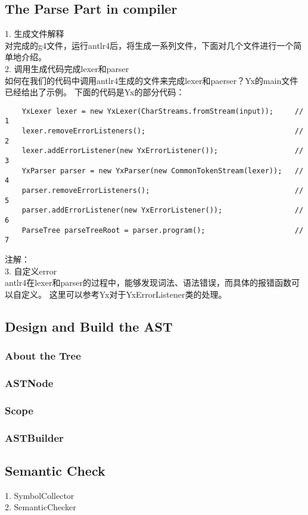 \subsection{The Parse Part in compiler}
1. 生成文件解释 \\
对完成的g4文件，运行antlr4后，将生成一系列文件，下面对几个文件进行一个简单地介绍。 \\


2. 调用生成代码完成lexer和parser \\
如何在我们的代码中调用antlr4生成的文件来完成lexer和paerser？Yx的main文件已经给出了示例。
下面的代码是Yx的部分代码：\\
\begin{verbatim}
    YxLexer lexer = new YxLexer(CharStreams.fromStream(input));     // 1
    lexer.removeErrorListeners();                                   // 2
    lexer.addErrorListener(new YxErrorListener());                  // 3    
    YxParser parser = new YxParser(new CommonTokenStream(lexer));   // 4
    parser.removeErrorListeners();                                  // 5
    parser.addErrorListener(new YxErrorListener());                 // 6
    ParseTree parseTreeRoot = parser.program();                     // 7
\end{verbatim}
注解： \\


3. 自定义error \\
antlr4在lexer和parser的过程中，能够发现词法、语法错误，而具体的报错函数可以自定义。
这里可以参考Yx对于YxErrorListener类的处理。

\subsection{Design and Build the AST}
\subsubsection{About the Tree}

\subsubsection{ASTNode}

\subsubsection{Scope}

\subsubsection{ASTBuilder}


\subsection{Semantic Check}
1. SymbolCollector \\

2. SemanticChecker \\




